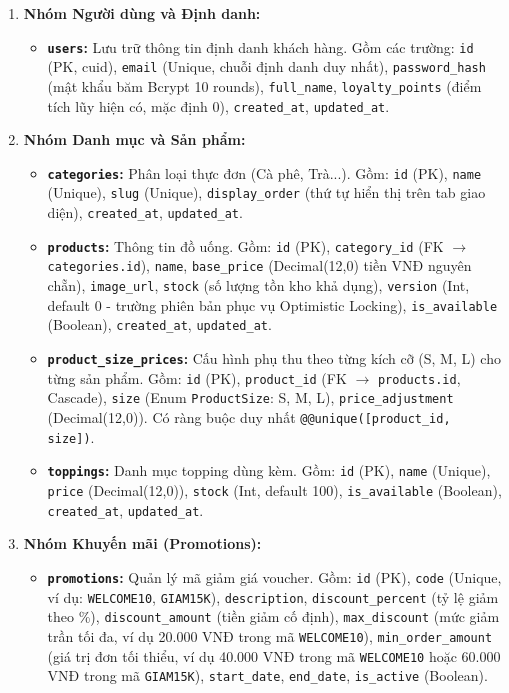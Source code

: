 \begin{enumerate}
    \item \textbf{Nhóm Người dùng và Định danh:}
    \begin{itemize}
        \item \textbf{\texttt{users}:} Lưu trữ thông tin định danh khách hàng. Gồm các trường: \texttt{id} (PK, cuid), \texttt{email} (Unique, chuỗi định danh duy nhất), \texttt{password\_hash} (mật khẩu băm Bcrypt 10 rounds), \texttt{full\_name}, \texttt{loyalty\_points} (điểm tích lũy hiện có, mặc định 0), \texttt{created\_at}, \texttt{updated\_at}.
    \end{itemize}

    \item \textbf{Nhóm Danh mục và Sản phẩm:}
    \begin{itemize}
        \item \textbf{\texttt{categories}:} Phân loại thực đơn (Cà phê, Trà...). Gồm: \texttt{id} (PK), \texttt{name} (Unique), \texttt{slug} (Unique), \texttt{display\_order} (thứ tự hiển thị trên tab giao diện), \texttt{created\_at}, \texttt{updated\_at}.
        \item \textbf{\texttt{products}:} Thông tin đồ uống. Gồm: \texttt{id} (PK), \texttt{category\_id} (FK \(\to\) \texttt{categories.id}), \texttt{name}, \texttt{base\_price} (Decimal(12,0) tiền VNĐ nguyên chẵn), \texttt{image\_url}, \texttt{stock} (số lượng tồn kho khả dụng), \texttt{version} (Int, default 0 - trường phiên bản phục vụ Optimistic Locking), \texttt{is\_available} (Boolean), \texttt{created\_at}, \texttt{updated\_at}.
        \item \textbf{\texttt{product\_size_prices}:} Cấu hình phụ thu theo từng kích cỡ (S, M, L) cho từng sản phẩm. Gồm: \texttt{id} (PK), \texttt{product\_id} (FK \(\to\) \texttt{products.id}, Cascade), \texttt{size} (Enum \texttt{ProductSize}: S, M, L), \texttt{price\_adjustment} (Decimal(12,0)). Có ràng buộc duy nhất \texttt{@@unique([product\_id, size])}.
        \item \textbf{\texttt{toppings}:} Danh mục topping dùng kèm. Gồm: \texttt{id} (PK), \texttt{name} (Unique), \texttt{price} (Decimal(12,0)), \texttt{stock} (Int, default 100), \texttt{is\_available} (Boolean), \texttt{created\_at}, \texttt{updated\_at}.
    \end{itemize}

    \item \textbf{Nhóm Khuyến mãi (Promotions):}
    \begin{itemize}
        \item \textbf{\texttt{promotions}:} Quản lý mã giảm giá voucher. Gồm: \texttt{id} (PK), \texttt{code} (Unique, ví dụ: \texttt{WELCOME10}, \texttt{GIAM15K}), \texttt{description}, \texttt{discount\_percent} (tỷ lệ giảm theo \%), \texttt{discount\_amount} (tiền giảm cố định), \texttt{max\_discount} (mức giảm trần tối đa, ví dụ 20.000 VNĐ trong mã \texttt{WELCOME10}), \texttt{min\_order\_amount} (giá trị đơn tối thiểu, ví dụ 40.000 VNĐ trong mã \texttt{WELCOME10} hoặc 60.000 VNĐ trong mã \texttt{GIAM15K}), \texttt{start\_date}, \texttt{end\_date}, \texttt{is\_active} (Boolean).
    \end{itemize}


\end{enumerate}
